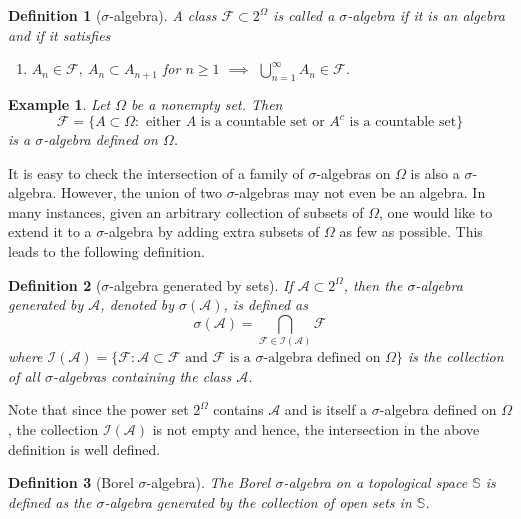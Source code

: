 \documentclass{report}
\newtheorem{definition}{Definition}[section]
\newtheorem{example}{Example}[section]
\theoremstyle{nonumberplain}
\begin{document}
\begin{definition}[$\sigma$-algebra]
	A class $\mathcal{F}\subset 2^{\Omega}$ is called a \emph{$\sigma$-algebra} if it is an algebra and if it satisfies
	\begin{enumerate}
		\item [(d')] $A_n\in\mathcal{F},\ A_n\subset A_{n+1}$ for $n\ge 1$ $\implies$ $\bigcup\limits_{n=1}^\infty A_n\in\mathcal{F}$.
	\end{enumerate}
\end{definition}

\begin{example}
	Let $\Omega$ be a nonempty set. Then
	\[
	\mathcal{F} = \{A\subset \Omega : \text{ either }A\text{ is a countable set or }A^c\text{ is a countable set}\}
	\]
	is a $\sigma$-algebra defined on $\Omega$.
\end{example}
It is easy to check the intersection of a family of $\sigma$-algebras on $\Omega$ is also a $\sigma$-algebra. However, the union of two $\sigma$-algebras may not even be an algebra. In many instances, given an arbitrary collection of subsets of $\Omega$, one would like to extend it to a $\sigma$-algebra by adding extra subsets of $\Omega$ as few as possible. This leads to the following definition.

\begin{definition}[$\sigma$-algebra generated by sets]
If $\mathcal{A}\subset2^\Omega$, then the \emph{$\sigma$-algebra generated by} $\mathcal{A}$, denoted by $\sigma(\mathcal{A})$, is defined as
\[
\sigma(\mathcal{A})=\bigcap_{\mathcal{F}\in\mathcal{I}(\mathcal{A})}\mathcal{F}
\]
where $\mathcal{I}(\mathcal{A})=\{\mathcal{F}:\mathcal{A}\subset \mathcal{F}\text{ and }\mathcal{F}\text{ is a }\sigma\text{-algebra defined on }\Omega\}$ is the collection of all $\sigma$-algebras containing the class $\mathcal{A}$.
\end{definition}
Note that since the power set $2^\Omega$ contains $\mathcal{A}$ and is itself a $\sigma$-algebra defined on $\Omega$, the collection $\mathcal{I}(\mathcal{A})$ is not empty and hence, the intersection in the above definition is well defined.

\begin{definition}[Borel $\sigma$-algebra]
	The \emph{Borel $\sigma$-algebra} on a topological space $\mathbb{S}$ is defined as the $\sigma$-algebra	generated by the collection of open sets in $\mathbb{S}$.
\end{definition}
\end{document}
